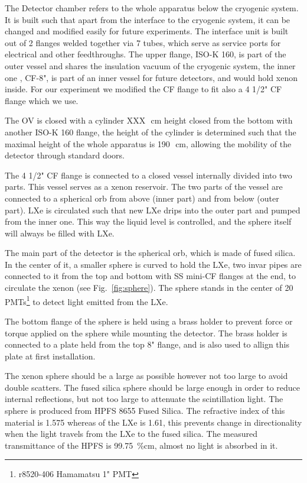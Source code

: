 The Detector chamber refers to the whole apparatus below the cryogenic system. It is built such that apart from the interface to the cryogenic system, it can be changed and modified easily for future experiments.
The interface unit is built out of 2 flanges welded together via 7 tubes, which serve as service ports for electrical and other feedthroughs. The upper flange, ISO-K 160, is part of the outer vessel and shares the insulation vacuum of the cryogenic system, the inner one , CF-8", is part of an inner vessel for future detectors, and would hold xenon inside. For our experiment we modified the CF flange to fit also a 4 1/2" CF flange which we use.

The OV is closed with a cylinder XXX~\,cm height closed from the bottom with another ISO-K 160 flange, the height of the cylinder is determined such that the maximal height of the whole apparatus is 190~\,cm, allowing the mobility of the detector through standard doors.
 
The 4 1/2" CF flange is connected to a closed vessel internally divided into two parts. This vessel serves as a xenon reservoir. The two parts of the vessel are connected to a spherical orb from above (inner part) and from below (outer part). LXe is circulated such that new LXe drips into the outer part and pumped from the inner one. This way the liquid level is controlled, and the sphere itself will always be filled with LXe. 

The main part of the detector is the spherical orb, which is made of fused silica. In the center of it, a smaller sphere is curved to hold the LXe, two invar pipes are connected to it from the top and bottom with SS mini-CF flanges at the end, to circulate the xenon (see Fig.~\ref{fig:sphere}). The sphere stands in the center of 20 PMTs\footnote{r8520-406 Hamamatsu 1" PMT} to detect light emitted from the LXe.

The bottom flange of the sphere is held using a brass holder to prevent force or torque applied on the sphere while mounting the detector. The brass holder is connected to a plate held from the top 8" flange, and is also used to allign this plate at first installation. 

The xenon sphere should be a large as possible however not too large to avoid double scatters. The fused silica sphere should be large enough in order to reduce internal reflections, but not too large to attenuate the scintillation light. The sphere is produced from HPFS 8655 Fused Silica. The refractive index of this material is 1.575 whereas of the LXe is 1.61, this prevents change in directionality when the light travels from the LXe to the fused silica. The measured transmittance of the HPFS is 99.75~\%cm, almost no light is absorbed in it.

